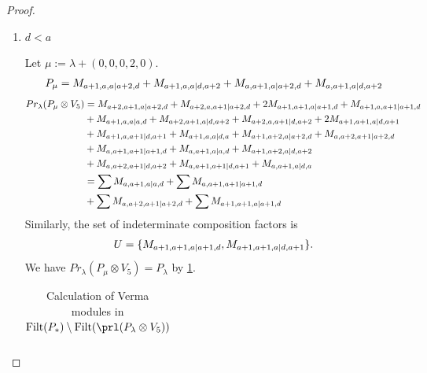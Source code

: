 \begin{proof}
\begin{enumerate}
\begin{enumerate}
\begin{enumerate}
            \item $ d < a $\par
        Let $\mu:=\lambda + (0,0,0,2,0) $.
        \begin{equation}\notag
          \begin{aligned}
            P_\mu = M_{a+1,a,a|a+2,d}
+ M_{a+1,a,a|d,a+2}
+ M_{a,a+1,a|a+2,d}
+ M_{a,a+1,a|d,a+2}
          \end{aligned}
        \end{equation}
        \begin{equation}\notag
          \begin{aligned}
            Pr_{\lambda}(P_\mu \otimes V_{5}) &=
M_{a+2,a+1,a|a+2,d}
+ M_{a+2,a,a+1|a+2,d}
+ 2M_{a+1,a+1,a|a+1,d}
+ M_{a+1,a,a+1|a+1,d}\\
                                               &
+ M_{a+1,a,a|a,d}
+ M_{a+2,a+1,a|d,a+2}
+ M_{a+2,a,a+1|d,a+2}
+ 2M_{a+1,a+1,a|d,a+1}\\
                                               &
+ M_{a+1,a,a+1|d,a+1}
+ M_{a+1,a,a|d,a}
+ M_{a+1,a+2,a|a+2,d}
+ M_{a,a+2,a+1|a+2,d}\\
                                               &
+ M_{a,a+1,a+1|a+1,d}
+ M_{a,a+1,a|a,d}
+ M_{a+1,a+2,a|d,a+2}\\
                                               &
+ M_{a,a+2,a+1|d,a+2}
+ M_{a,a+1,a+1|d,a+1}
+ M_{a,a+1,a|d,a} \\
                                               &=
\sum M_{a,a+1,a|a,d}
+ \sum M_{a,a+1,a+1|a+1,d}\\
                                               &
+ \sum M_{a,a+2,a+1|a+2,d}
+ \sum M_{a+1,a+1,a|a+1,d}
          \end{aligned}
        \end{equation}
      Similarly, the set of indeterminate composition factors is 
\begin{equation}\notag
  \begin{aligned}
    U = \{
M_{a+1,a+1,a|a+1,d},
M_{a+1,a+1,a|d,a+1}
\}.
  \end{aligned}
\end{equation}
       We have $Pr_{\lambda}(P_\mu \otimes V_{5}) = P_\lambda  $ by \cref{tab:verma-analysis_1_a_5}.
\begin{table}[htbp]
\centering
\caption{Calculation of Verma modules in $\operatorname{Filt}(P_*) \setminus \operatorname{Filt}(\prl(P_\lambda \otimes V_{5})) $ } \label{tab:verma-analysis_1_a_5}
\begin{tabular}{cc}

\end{tabular}
\end{table}
\end{enumerate}
\end{enumerate}
\end{enumerate}
\end{proof}
